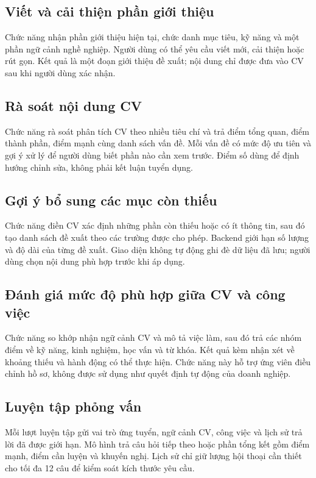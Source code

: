 \subsection{Viết và cải thiện phần giới thiệu}

Chức năng nhận phần giới thiệu hiện tại, chức danh mục tiêu, kỹ năng và một phần ngữ cảnh nghề nghiệp. Người dùng có thể yêu cầu viết mới, cải thiện hoặc rút gọn. Kết quả là một đoạn giới thiệu đề xuất; nội dung chỉ được đưa vào CV sau khi người dùng xác nhận.

\subsection{Rà soát nội dung CV}

Chức năng rà soát phân tích CV theo nhiều tiêu chí và trả điểm tổng quan, điểm thành phần, điểm mạnh cùng danh sách vấn đề. Mỗi vấn đề có mức độ ưu tiên và gợi ý xử lý để người dùng biết phần nào cần xem trước. Điểm số dùng để định hướng chỉnh sửa, không phải kết luận tuyển dụng.

\subsection{Gợi ý bổ sung các mục còn thiếu}

Chức năng điền CV xác định những phần còn thiếu hoặc có ít thông tin, sau đó tạo danh sách đề xuất theo các trường được cho phép. Backend giới hạn số lượng và độ dài của từng đề xuất. Giao diện không tự động ghi đè dữ liệu đã lưu; người dùng chọn nội dung phù hợp trước khi áp dụng.

\subsection{Đánh giá mức độ phù hợp giữa CV và công việc}

Chức năng so khớp nhận ngữ cảnh CV và mô tả việc làm, sau đó trả các nhóm điểm về kỹ năng, kinh nghiệm, học vấn và từ khóa. Kết quả kèm nhận xét về khoảng thiếu và hành động có thể thực hiện. Chức năng này hỗ trợ ứng viên điều chỉnh hồ sơ, không được sử dụng như quyết định tự động của doanh nghiệp.

\subsection{Luyện tập phỏng vấn}

Mỗi lượt luyện tập gửi vai trò ứng tuyển, ngữ cảnh CV, công việc và lịch sử trả lời đã được giới hạn. Mô hình trả câu hỏi tiếp theo hoặc phần tổng kết gồm điểm mạnh, điểm cần luyện và khuyến nghị. Lịch sử chỉ giữ lượng hội thoại cần thiết cho tối đa 12 câu để kiểm soát kích thước yêu cầu.

